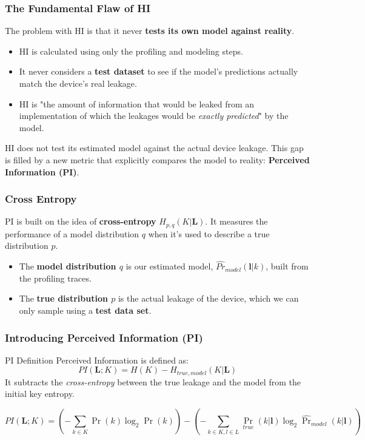 \begin{frame}
    \frametitle{The Fundamental Flaw of HI}
    
    The problem with HI is that it never \textbf{tests its own model against reality}.
        \begin{itemize}
            \item HI is calculated using only the profiling and modeling steps.
            \item It never considers a \textbf{test dataset} to see if the model's predictions actually match the device's real leakage.
            \item HI is "the amount of information that would be leaked from an implementation of which the leakages would be \textit{exactly predicted}" by the model.
        \end{itemize}
    
    
    \begin{alertblock}{}
    HI does not test its estimated model against the actual device leakage. \newline
        This gap is filled by a new metric that explicitly compares the model to reality: \textbf{Perceived Information (PI)}.
    \end{alertblock}
\end{frame}

\begin{frame}
    \frametitle{Cross Entropy}
    
    \begin{block}{}
        PI is built on the idea of \textbf{cross-entropy} $H_{p,q}(K|\mathbf{L})$. It measures the performance of a model distribution $q$ when it's used to describe a true distribution $p$.
        
        \begin{itemize}
            \item The \textbf{model distribution $q$} is our estimated model, $\hat{Pr}_{model}(\mathbf{l}|k)$, built from the profiling traces.
            \item The \textbf{true distribution $p$} is the actual leakage of the device, which we can only sample using a \textbf{ test data set}.
        \end{itemize}
    \end{block}
\end{frame}

\begin{frame}
    \frametitle{Introducing Perceived Information (PI)}
     \begin{block}{PI Definition}
        Perceived Information is defined as:
        $$ PI(\mathbf{L};K) = H(K) - H_{true, model}(K|\mathbf{L}) $$
        It subtracts the \textit{cross-entropy} between the true leakage and the model from the initial key entropy.
    \end{block}
    $$ PI(\mathbf{L};K) = (-\sum_{k \in K}\Pr(k)\log_2\Pr(k))-(-\sum_{k \in K,l \in L}\Pr_{true}(k|\mathbf{l})\log_2\hat{\Pr}_{model}(k|\mathbf{l})) $$
\end{frame}

